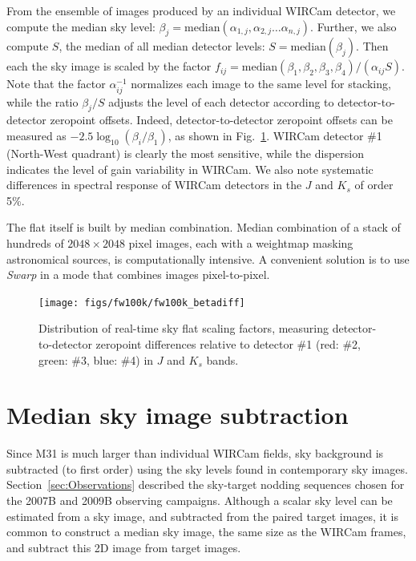 \documentclass[iop]{emulateapj}
\newcommand{\sw}[1]{\textit{#1}} %
\newcommand{\Fig}[1]{Fig.~\ref{fig:#1}}  %
\begin{document}
From the ensemble of images produced by an individual WIRCam detector, we compute the median sky level: $\beta_j = \mathrm{median}(\alpha_{1,j}, \alpha_{2,j}\ldots \alpha_{n,j} )$.
Further, we also compute $S$, the median of all median detector levels: $S=\mathrm{median}(\beta_j)$.
Then each the sky image is scaled by the factor $f_{ij} = \mathrm{median}(\beta_1, \beta_2, \beta_3, \beta_4) / (\alpha_{ij} S)$.
Note that the factor $\alpha_{ij}^{-1}$ normalizes each image to the same level for stacking, while the ratio $\beta_j / S$ adjusts the level of each detector according to detector-to-detector zeropoint offsets.
Indeed, detector-to-detector zeropoint offsets can be measured as $-2.5 \log_{10}(\beta_i / \beta_1)$, as shown in \Fig{fw100k_zpdiff}.
WIRCam detector \#1 (North-West quadrant) is clearly the most sensitive, while the dispersion indicates the level of gain variability in WIRCam.
We also note systematic differences in spectral response of WIRCam detectors in the $J$ and $K_s$ of order 5\%.

The flat itself is built by median combination.
Median combination of a stack of hundreds of $2048\times2048$ pixel images, each with a weightmap masking astronomical sources, is computationally intensive.
A convenient solution is to use \sw{Swarp} \citep[an image-mosaicing software package,][]{Bertin:2002} in a mode that combines images pixel-to-pixel.

\begin{figure}[t]
\centering
\texttt{[image: figs/fw100k/fw100k\_betadiff]}
\caption{Distribution of real-time sky flat scaling factors, measuring detector-to-detector zeropoint differences relative to detector \#1 (red: \#2, green: \#3, blue: \#4) in $J$ and $K_s$ bands.
}
\label{fig:fw100k_zpdiff}
\end{figure}

\section{Median sky image subtraction}
\label{sec:mediansky}

Since M31 is much larger than individual WIRCam fields, sky background is subtracted (to first order) using the sky levels found in contemporary sky images.
Section~\ref{sec:Observations} described the sky-target nodding sequences chosen for the 2007B and 2009B observing campaigns. 
Although a scalar sky level can be estimated from a sky image, and subtracted from the paired target images, it is common to construct a median sky image, the same size as the WIRCam frames, and subtract this 2D image from target images.
\end{document}
